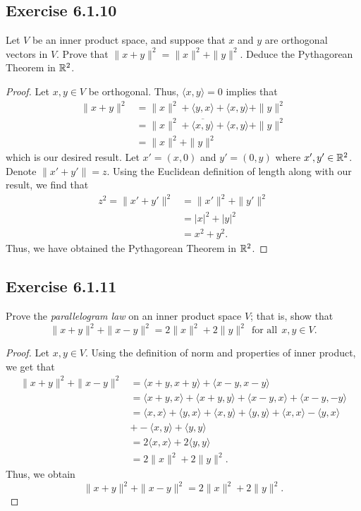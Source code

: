 \subsection*{Exercise 6.1.10} Let \( V  \) be an inner product space, and suppose that \( x  \) and \( y  \) are orthogonal vectors in \( V  \). Prove that \( \| x + y \|^{2} = \|x\|^{2} + \|y\|^{2}. \) Deduce the Pythagorean Theorem in \( \mathbb{R}^{2} \).
\begin{proof}
Let \( x,y \in V  \) be orthogonal. Thus, \( \langle x , y \rangle = 0 \) implies that
\begin{align*}
    \|x + y\|^{2}  &= \|x\|^{2} +  \langle y , x \rangle + \langle x , y \rangle + \|y\|^{2} \\
                  &= \|x\|^{2} + \overline{\langle x , y \rangle} + \langle x , y \rangle + \|y\|^{2} \\
                  &= \|x\|^{2} + \|y\|^{2}
\end{align*}
which is our desired result. Let \( x' = (x,0)  \) and \( y' = (0,y)  \) where \( x',y' \in \mathbb{R}^{2}  \). Denote \( \| x' + y' \| = z  \). Using the Euclidean definition of length along with our result, we find that 
\begin{align*}
    z^{2} = \| x' + y'\|^{2} &= \|x'\|^{2} + \|y'\|^{2}  \\
          &= | x |^{2} + | y |^{2} \\ 
          &= x^{2} + y^{2}.
\end{align*}
Thus, we have obtained the Pythagorean Theorem in \( \mathbb{R}^{2} \).
\end{proof}

\subsection*{Exercise 6.1.11} Prove the \textit{parallelogram law} on an inner product space \( V  \); that is, show that
\[  \|x + y \|^{2} + \|x - y \|^{2} = 2 \|x\|^{2} + 2 \|y\|^{2} \ \ \text{for all} \ \ x,y \in V. \]
\begin{proof}
Let \( x,y \in V  \). Using the definition of norm and properties of inner product, we get that
\begin{align*}
    \|x + y\|^{2} + \|x - y\|^{2} &= \langle x + y  ,  x + y  \rangle + \langle x -y  , x - y  \rangle \\
                                  &= \langle x + y  , x  \rangle + \langle x + y  , y \rangle + \langle x - y  , x  \rangle + \langle x - y  , -y  \rangle \\
                                  &= \langle x  , x \rangle + \langle y , x \rangle + \langle x  , y \rangle + \langle y  , y \rangle + \langle x  , x \rangle - \langle y , x \rangle \\
                                  &+ - \langle x , y \rangle + \langle y , y \rangle \\
                                  &= 2 \langle x , x \rangle + 2 \langle y , y \rangle \\
                                  &= 2 \|x\|^{2} + 2 \|y\|^{2}.
\end{align*}
Thus, we obtain
\[  \|x + y \|^{2} + \|x - y\|^{2} = 2 \|x\|^{2} + 2 \|y\|^{2}. \]
\end{proof}

